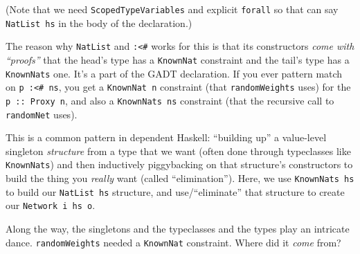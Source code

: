 \documentclass[]{article}
\newenvironment{Shaded}{}{}
\newcommand{\KeywordTok}[1]{\textcolor[rgb]{0.00,0.44,0.13}{\textbf{{#1}}}}
\newcommand{\DataTypeTok}[1]{\textcolor[rgb]{0.56,0.13,0.00}{{#1}}}
\newcommand{\CommentTok}[1]{\textcolor[rgb]{0.38,0.63,0.69}{\textit{{#1}}}}
\newcommand{\OtherTok}[1]{\textcolor[rgb]{0.00,0.44,0.13}{{#1}}}
\newcommand{\FunctionTok}[1]{\textcolor[rgb]{0.02,0.16,0.49}{{#1}}}
\newcommand{\NormalTok}[1]{{#1}}
\begin{document}
\begin{Shaded}
\end{Shaded}

(Note that we need \texttt{ScopedTypeVariables} and explicit
\texttt{forall} so that can say \texttt{NatList\ hs} in the body of the
declaration.)

The reason why \texttt{NatList} and \texttt{:\textless{}\#} works for
this is that its constructors \emph{come with ``proofs''} that the
head's type has a \texttt{KnownNat} constraint and the tail's type has a
\texttt{KnownNats} one. It's a part of the GADT declaration. If you ever
pattern match on \texttt{p\ :\textless{}\#\ ns}, you get a
\texttt{KnownNat\ n} constraint (that \texttt{randomWeights} uses) for
the \texttt{p\ ::\ Proxy\ n}, and also a \texttt{KnownNats\ ns}
constraint (that the recursive call to \texttt{randomNet} uses).

This is a common pattern in dependent Haskell: ``building up'' a
value-level singleton \emph{structure} from a type that we want (often
done through typeclasses like \texttt{KnownNats}) and then inductively
piggybacking on that structure's constructors to build the thing you
\emph{really} want (called ``elimination''). Here, we use
\texttt{KnownNats\ hs} to build our \texttt{NatList\ hs} structure, and
use/``eliminate'' that structure to create our
\texttt{Network\ i\ hs\ o}.

Along the way, the singletons and the typeclasses and the types play an
intricate dance. \texttt{randomWeights} needed a \texttt{KnownNat}
constraint. Where did it \emph{come} from?
\end{document}
